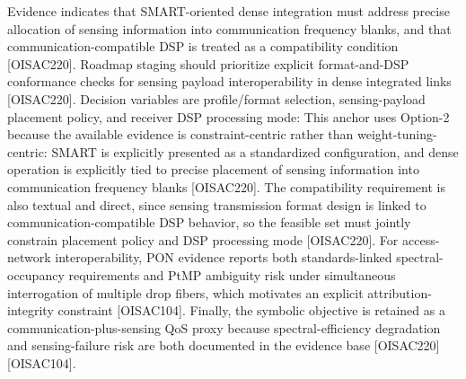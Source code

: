 {} Evidence indicates that SMART-oriented dense integration must address precise allocation of sensing information into communication frequency blanks, and that communication-compatible DSP is treated as a compatibility condition [O\markdownRendererUnderscore{}ISAC\markdownRendererUnderscore{}220].\markdownRendererParagraphSeparator
{} Roadmap staging should prioritize explicit format-and-DSP conformance checks for sensing payload interoperability in dense integrated links [O\markdownRendererUnderscore{}ISAC\markdownRendererUnderscore{}220].\markdownRendererInterblockSeparator
{}
\markdownRendererSectionEnd \markdownRendererSectionBegin
{}\markdownRendererInterblockSeparator
{}Decision variables are profile/format selection, sensing-payload placement policy, and receiver DSP processing mode:\markdownRendererParagraphSeparator
{}\markdownRendererParagraphSeparator
{}This anchor uses Option-2 because the available evidence is constraint-centric rather than weight-tuning-centric: SMART is explicitly presented as a standardized configuration, and dense operation is explicitly tied to precise placement of sensing information into communication frequency blanks [O\markdownRendererUnderscore{}ISAC\markdownRendererUnderscore{}220]. The compatibility requirement is also textual and direct, since sensing transmission format design is linked to communication-compatible DSP behavior, so the feasible set must jointly constrain placement policy and DSP processing mode [O\markdownRendererUnderscore{}ISAC\markdownRendererUnderscore{}220]. For access-network interoperability, PON evidence reports both standards-linked spectral-occupancy requirements and PtMP ambiguity risk under simultaneous interrogation of multiple drop fibers, which motivates an explicit attribution-integrity constraint [O\markdownRendererUnderscore{}ISAC\markdownRendererUnderscore{}104]. Finally, the symbolic objective  is retained as a communication-plus-sensing QoS proxy because spectral-efficiency degradation and sensing-failure risk are both documented in the evidence base [O\markdownRendererUnderscore{}ISAC\markdownRendererUnderscore{}220] [O\markdownRendererUnderscore{}ISAC\markdownRendererUnderscore{}104].\markdownRendererInterblockSeparator
